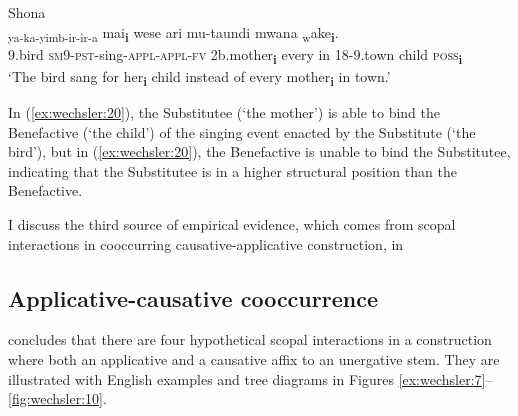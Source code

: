 \documentclass[output=paper,modfonts,nonflat,colorlinks,citecolor=brown]{langsci/langscibook}
\begin{document}
\ea\label{ex:wechsler:20}
Shona\\
\ea
{} {\textsubscript{ya-ka-yimb-ir-ir-a} } {mai}\textbf{{\textsubscript{i}}} {wese} {ari}  {{mu-taundi}}  {{mwana}} {\textsubscript{w}}{ake}\textbf{{\textsubscript{i}}}.\\
 9.bird  \textsc{sm}9-\textsc{pst}{}-sing-\textsc{appl-appl-fv}  2b.mother\textbf{\textsubscript{i}}  every  in  {18-9.town}  {child}  \textsc{poss}\textbf{\textsubscript{i}}\\
\glt `The bird sang for her\textbf{\textsubscript{i}} child instead of every mother\textbf{\textsubscript{i}} in town.’   \\

\z
\z

In (\ref{ex:wechsler:20}), the Substitutee (‘the mother’) is able to bind the Benefactive (‘the child’) of the singing event enacted by the Substitute (‘the bird’), but in (\ref{ex:wechsler:20}), the Benefactive is unable to bind the Substitutee, indicating that the Substitutee is in a higher structural position than the Benefactive.



I discuss the third source of empirical evidence, which comes from scopal interactions in cooccurring causative-applicative construction, in 

\subsection{Applicative-causative cooccurrence}\label{sec:wechsler:3.4}

\citet{Wechsler2016} concludes that there are four hypothetical scopal interactions in a construction where both an applicative and a causative affix to an unergative stem. They are illustrated with English examples and tree diagrams in Figures \ref{ex:wechsler:7}--\ref{fig:wechsler:10}.%
\end{document}
